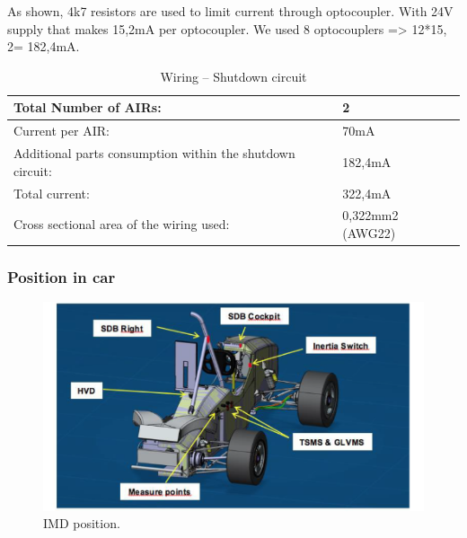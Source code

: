 As shown, 4k7 resistors are used to limit current through optocoupler. With 24V supply that makes 15,2mA per optocoupler. We used 8 optocouplers => 12*15, 2= 182,4mA.
\begin{table}[H]
	\centering
	\caption{Wiring – Shutdown circuit}
	\begin{tabularx}{\textwidth}{|X|X|}
		\hline
		Total Number of AIRs: & 2 \\[\TableSize]
		\hline
		Current per AIR: & 70mA \\[\TableSize]
		\hline
		Additional parts consumption within the shutdown circuit: & 182,4mA \\[\TableSize]
		\hline
		Total current: & 322,4mA \\[\TableSize]
		\hline
		Cross sectional area of the wiring used: & 0,322mm2 (AWG22) \\[\TableSize]
		\hline
	\end{tabularx}%
	\label{tab:SDC-Wiring}%
\end{table}%


\subsubsection{Position in car}

\begin{figure}[H]
	\includegraphics[width=\textwidth]{./img/SDC-positionInCar.png}
	\caption{IMD position.}
	\label{fig:SDC-positionInCar}
\end{figure}